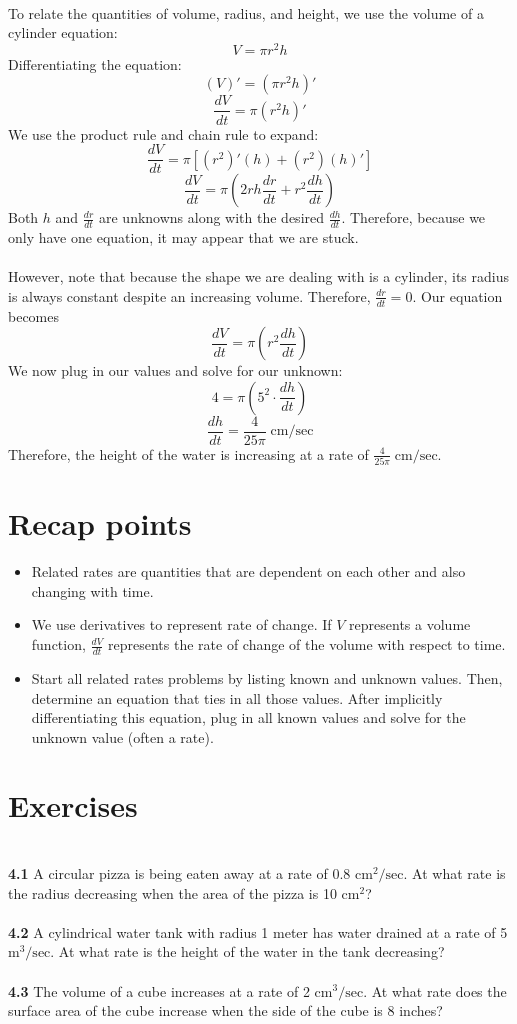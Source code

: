 \documentclass[11pt]{scrartcl}
\begin{document}
\\
\noindent 
To relate the quantities of volume, radius, and height, we use the volume of a cylinder equation:
$$V=\pi r^2 h$$
Differentiating the equation:
$$(V)'=(\pi r^2 h)'$$
$$\frac{dV}{dt}=\pi(r^2h)'$$
We use the product rule and chain rule to expand:
$$\frac{dV}{dt}=\pi[(r^2)'(h)+(r^2)(h)']$$
$$\frac{dV}{dt}=\pi(2rh\frac{dr}{dt}+r^2\frac{dh}{dt})$$
\noindent 
Both $h$ and $\frac{dr}{dt}$ are unknowns along with the desired $\frac{dh}{dt}$. Therefore, because we only have one equation, it may appear that we are stuck. \\
\\
\noindent 
However, note that because the shape we are dealing with is a cylinder, its radius is always constant despite an increasing volume. Therefore, $\frac{dr}{dt}=0$. Our equation becomes  
$$\frac{dV}{dt}=\pi(r^2\frac{dh}{dt})$$
We now plug in our values and solve for our unknown:
$$4=\pi(5^2\cdot\frac{dh}{dt})$$
$$\frac{dh}{dt}=\frac{4}{25\pi} \; \text{cm/sec}$$
\noindent 
Therefore, the height of the water is increasing at a rate of $\frac{4}{25\pi} \; \text{cm/sec}$. 
\section{Recap points}
\begin{itemize}
    \item Related rates are quantities that are dependent on each other and also changing with time. 
    \item We use derivatives to represent rate of change. If $V$ represents a volume function, $\frac{dV}{dt}$ represents the rate of change of the volume with respect to time. 
    \item Start all related rates problems by listing known and unknown values. Then, determine an equation that ties in all those values. After implicitly differentiating this equation, plug in all known values and solve for the unknown value (often a rate). 
\end{itemize}
\section{Exercises}\\
\noindent
\textbf{4.1} A circular pizza is being eaten away at a rate of 0.8 $\text{cm}^2/\text{sec}$. At what rate is the radius decreasing when the area of the pizza is 10 $\text{cm}^2$? \\
\noindent\\
\textbf{4.2} A cylindrical water tank with radius 1 meter has water drained at a rate of 5 $\text{m}^3/\text{sec}$. At what rate is the height of the water in the tank decreasing? \\
\noindent\\
\textbf{4.3} The volume of a cube increases at a rate of 2 $\text{cm}^3/\text{sec}$. At what rate does the surface area of the cube increase when the side of the cube is 8 inches?
\end{document}
